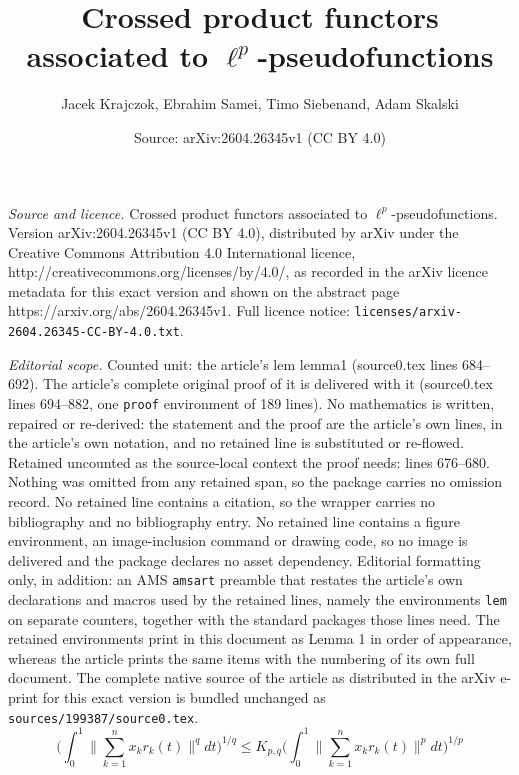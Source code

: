 \documentclass[10pt,a4paper]{amsart}
\title{Crossed product functors associated to $\ell^p$-pseudofunctions}
\author{Jacek Krajczok, Ebrahim Samei, Timo Siebenand, Adam Skalski}
\date{Source: arXiv:2604.26345v1 (CC BY 4.0)}
\newcommand{\md}{d}
\begin{document}
\maketitle

\noindent\emph{Source and licence.} Crossed product functors associated to $\ell^p$-pseudofunctions. Version arXiv:2604.26345v1 (CC BY 4.0), distributed by arXiv under the Creative Commons Attribution 4.0 International licence, http://creativecommons.org/licenses/by/4.0/, as recorded in the arXiv licence metadata for this exact version and shown on the abstract page https://arxiv.org/abs/2604.26345v1. Full licence notice: \texttt{licenses/arxiv-2604.26345-CC-BY-4.0.txt}.\par\smallskip

\noindent\textit{Editorial scope.} Counted unit: the article's lem lemma1 (source0.tex lines 684--692). The article's complete original proof of it is delivered with it (source0.tex lines 694--882, one \texttt{proof} environment of 189 lines). No mathematics is written, repaired or re-derived: the statement and the proof are the article's own lines, in the article's own notation, and no retained line is substituted or re-flowed.  Retained uncounted as the source-local context the proof needs: lines 676--680.  Nothing was omitted from any retained span, so the package carries no omission record.  No retained line contains a citation, so the wrapper carries no bibliography and no bibliography entry.  No retained line contains a figure environment, an image-inclusion command or drawing code, so no image is delivered and the package declares no asset dependency.  Editorial formatting only, in addition: an AMS \texttt{amsart} preamble that restates the article's own declarations and macros used by the retained lines, namely the environments \texttt{lem} on separate counters, together with the standard packages those lines need.  The retained environments print in this document as Lemma 1 in order of appearance, whereas the article prints the same items with the numbering of its own full document.  The complete native source of the article as distributed in the arXiv e-print for this exact version is bundled unchanged as \texttt{sources/199387/source0.tex}.
\begin{equation} \label{KKInequality}
\bigl(\int_{0}^{1}\bigl\|\sum_{k=1}^{n} x_k r_k(t)\bigr\|^q \md t\bigr)^{1/q}\le
K_{p,q}
\bigl(\int_{0}^{1}\bigl\|\sum_{k=1}^{n} x_k r_k(t)\bigr\|^p \md t\bigr)^{1/p}
\end{equation}
\end{document}
